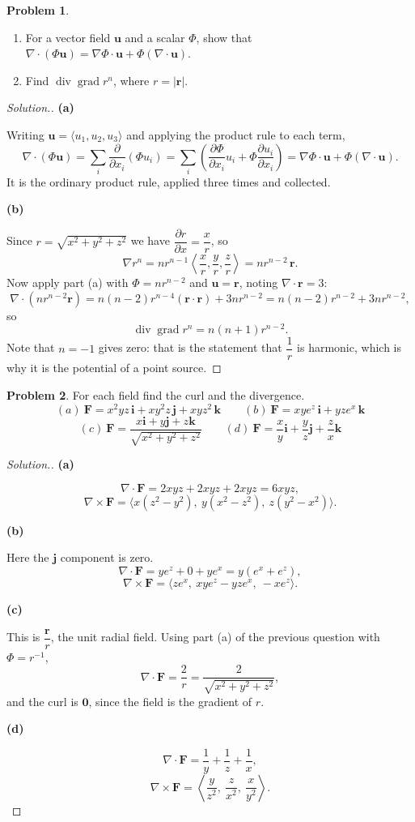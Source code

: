 \documentclass[11pt,a4paper]{article}
\DeclareMathOperator{\grad}{grad}
\DeclareMathOperator{\dive}{div}
\theoremstyle{definition}
\newtheorem{problemx}{Problem}[subsection]
\newenvironment{problem}{\begin{problemx}}{\end{problemx}}
\newenvironment{solution}
  {\renewcommand{\qedsymbol}{}\begin{proof}[\textit{Solution}.]}
  {\end{proof}}
\newcommand{\subhead}[1]{%
  \par\medskip\noindent\textbf{#1}\par\nobreak\smallskip}
\begin{document}
\begin{problem}
\begin{enumerate}
\item[(a)] For a vector field $\mathbf{u}$ and a scalar $\Phi$, show that
$\nabla\cdot(\Phi\mathbf{u}) = \nabla\Phi\cdot\mathbf{u}
+ \Phi(\nabla\cdot\mathbf{u})$.
\item[(b)] Find $\dive\grad r^n$, where $r = \left|\mathbf r\right|$.
\end{enumerate}
\end{problem}
\begin{solution}
\subhead{(a)}
Writing $\mathbf{u} = \langle u_1,u_2,u_3\rangle$ and applying the product rule
to each term,
\[\nabla\cdot(\Phi\mathbf{u})
= \sum_{i}\frac{\partial}{\partial x_i}(\Phi u_i)
= \sum_i\left(\frac{\partial\Phi}{\partial x_i}u_i
+ \Phi\frac{\partial u_i}{\partial x_i}\right)
= \nabla\Phi\cdot\mathbf{u} + \Phi(\nabla\cdot\mathbf{u}).\]
It is the ordinary product rule, applied three times and collected.

\subhead{(b)}
Since $r = \sqrt{x^2+y^2+z^2}$ we have
$\dfrac{\partial r}{\partial x} = \dfrac{x}{r}$, so
\[\nabla r^n = nr^{n-1}\left\langle\frac xr,\frac yr,\frac zr\right\rangle
= nr^{n-2}\,\mathbf r.\]
Now apply part (a) with $\Phi = nr^{n-2}$ and $\mathbf{u} = \mathbf r$,
noting $\nabla\cdot\mathbf r = 3$:
\[\nabla\cdot(nr^{n-2}\mathbf r)
= n(n-2)r^{n-4}(\mathbf r\cdot\mathbf r) + 3nr^{n-2}
= n(n-2)r^{n-2} + 3nr^{n-2},\]
so
\[\dive\grad r^n = n(n+1)r^{n-2}.\]
Note that $n = -1$ gives zero: that is the statement that $\dfrac1r$ is
harmonic, which is why it is the potential of a point source.
\end{solution}

\begin{problem}
For each field find the curl and the divergence.
\[(a)\ \mathbf{F} = x^2yz\,\mathbf{i} + xy^2z\,\mathbf{j} + xyz^2\,\mathbf{k}
\qquad (b)\ \mathbf{F} = xye^z\,\mathbf{i} + yze^x\,\mathbf{k}\]
\[(c)\ \mathbf{F} = \frac{x\mathbf{i}+y\mathbf{j}+z\mathbf{k}}
{\sqrt{x^2+y^2+z^2}}\qquad 
(d)\ \mathbf{F} = \frac{x}{y}\mathbf{i} + \frac{y}{z}\mathbf{j}
+ \frac{z}{x}\mathbf{k}\]
\end{problem}
\begin{solution}
\subhead{(a)}
\[\nabla\cdot\mathbf{F} = 2xyz + 2xyz + 2xyz = 6xyz ,\]
\[\nabla\times\mathbf{F}
= \langle x(z^2-y^2),\ y(x^2-z^2),\ z(y^2-x^2)
\rangle .\]

\subhead{(b)}
Here the $\mathbf{j}$ component is zero.
\[\nabla\cdot\mathbf{F} = ye^z + 0 + ye^x = y(e^x+e^z),\]
\[\nabla\times\mathbf{F}
= \langle ze^x,\ xye^z - yze^x,\ -xe^z\rangle .\]

\subhead{(c)}
This is $\dfrac{\mathbf r}{r}$, the unit radial field. Using part (a) of the
previous question with $\Phi = r^{-1}$,
\[\nabla\cdot\mathbf{F} = \frac2r = \frac{2}{\sqrt{x^2+y^2+z^2}},\]
and the curl is $\textbf{0}$, since the field is the gradient of $r$.

\subhead{(d)}
\[\nabla\cdot\mathbf{F} = \frac1y + \frac1z + \frac1x ,\]
\[\nabla\times\mathbf{F}
= \left\langle \frac{y}{z^2},\ \frac{z}{x^2},\ \frac{x}{y^2}\right\rangle .\]
\end{solution}
\end{document}
